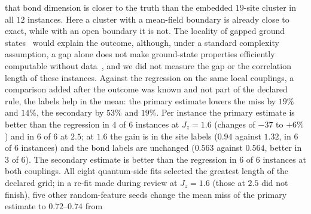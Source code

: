 \documentclass[aps,prx,onecolumn,10pt,nofootinbib,longbibliography,floatfix]{revtex4-2}
\theoremstyle{remark}
\newcommand{\Jz}{J_z}
\begin{document}
that bond dimension is closer to the truth than the embedded $19$-site cluster in all $12$ instances. %
Here a cluster with a mean-field boundary is already close to exact, while with an open boundary it is not. The
locality of gapped ground states~\cite{deroeck2015,trivedi2022,teufel2026,osborne2007} would explain the outcome,
although, under a standard complexity assumption, a gap alone does not make ground-state properties efficiently
computable without data~\cite{huang2022}, and we did not measure the gap or the correlation length of these
instances. Against the regression on the same local couplings, a comparison added after the outcome was known
and not part of the declared rule, the labels help in the mean: the primary estimate lowers the
miss by $19\%$ and $14\%$, the secondary by $53\%$ and $19\%$. %
Per instance the primary estimate is better than the regression in $4$ of $6$ instances at $\Jz=1.6$ (changes of %
$-37$ to $+6\%$) and in $6$ of $6$ at $2.5$; at $1.6$ the gain is in the site labels ($0.94$ against $1.32$, in %
$6$ of $6$ instances) and the bond labels are unchanged ($0.563$ against $0.564$, better in $3$ of $6$). The %
secondary estimate is better than the regression in $6$ of $6$ instances at both couplings. All eight quantum-side %
fits selected the greatest length of the declared grid; in a re-fit made during review at $\Jz=1.6$ (those at $2.5$ %
did not finish), five other random-feature seeds change the mean miss of the primary estimate to $0.72$--$0.74$ from %
\end{document}
